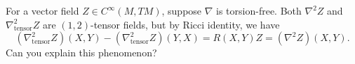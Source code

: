 
\begin{exercise}
    For a vector field $Z\in C^\infty(M,TM)$, suppose $\nabla$ is torsion-free. 
    Both $\nabla^2 Z$ and $\nabla_{\text{tensor}}^2 Z$ are $(1,2)$-tensor fields, 
    but by Ricci identity, we have
    \begin{equation*}
        (\nabla_{\text{tensor}}^2 Z)(X,Y) - (\nabla_{\text{tensor}}^2 Z)(Y,X) = R(X,Y)Z = (\nabla^2 Z)(X,Y).
    \end{equation*}
    Can you explain this phenomenon?
\end{exercise}


